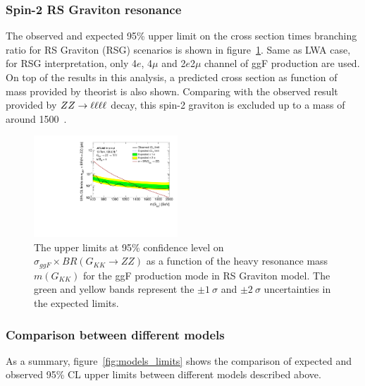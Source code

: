 \subsubsection{Spin-2 RS Graviton resonance}

The observed and expected 95\% upper limit on the cross section times branching ratio for RS Graviton (RSG) scenarios is shown in figure~\ref{fig:RSGlimits_ggF_201518}.
Same as LWA case, for RSG interpretation, only 4$e$, 4$\mu$ and 2$e$2$\mu$ channel of ggF production are used.
On top of the results in this analysis, a predicted cross section as function of mass provided by theorist is also shown.
Comparing with the observed result provided by $ZZ \rightarrow \ell\ell\ell\ell$ decay, this spin-2 graviton is excluded up to a mass of around 1500~\gev.

\begin{figure}[h]
    \begin{center}
    \includegraphics[width=0.48\textwidth]{figures/HMHZZ/results/Limits_RSG.pdf}
    \end{center}
    \caption{The upper limits at 95\% confidence level on $\sigma_{ggF} \times BR(G_{KK}\rightarrow ZZ)$
    as a function of the heavy resonance mass $m(G_{KK})$ for the ggF production mode in RS Graviton model.
    The green and yellow bands represent the $\pm 1~\sigma$ and $\pm 2~\sigma$ uncertainties in the expected limits.
  }
    \label{fig:RSGlimits_ggF_201518}
\end{figure}

\subsubsection{Comparison between different models}

As a summary, figure~\ref{fig:models_limits} shows the comparison of expected and observed 95\% CL upper limits between different models described above.


